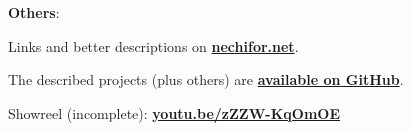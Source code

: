 \documentclass[a4wide]{article}
\begin{document}


\vspace{5mm}

\textbf{Others}:


\vspace*{\fill}

\begin{center}
Links and better descriptions on \href{http://nechifor.net}{\textbf{nechifor.net}}.

The described projects (plus others) are
\href{http://github.com/paul-nechifor}{\textbf{available on GitHub}}.

Showreel (incomplete): \href{http://youtu.be/zZZW-KqOmOE}{\bf youtu.be/zZZW-KqOmOE}
\end{center}
\end{document}
